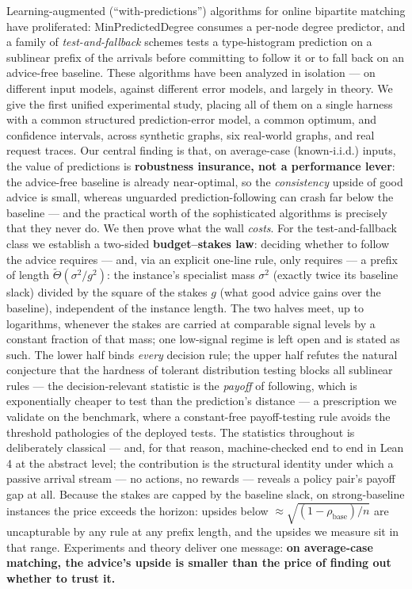 Learning-augmented (``with-predictions'') algorithms for online
bipartite matching have proliferated: MinPredictedDegree consumes a
per-node degree predictor, and a family of \emph{test-and-fallback}
schemes tests a type-histogram prediction on a sublinear prefix of the
arrivals before committing to follow it or to fall back on an
advice-free baseline. These algorithms have been analyzed in isolation
--- on different input models, against different error models, and
largely in theory. We give the first unified experimental study, placing
all of them on a single harness with a common structured
prediction-error model, a common optimum, and confidence intervals,
across synthetic graphs, six real-world graphs, and real request traces.
Our central finding is that, on average-case (known-i.i.d.) inputs, the
value of predictions is \textbf{robustness insurance, not a performance
lever}: the advice-free baseline is already near-optimal, so the
\emph{consistency} upside of good advice is small, whereas unguarded
prediction-following can crash far below the baseline --- and the
practical worth of the sophisticated algorithms is precisely that they
never do. We then prove what the wall \emph{costs}. For the
test-and-fallback class we establish a two-sided \textbf{budget--stakes
law}: deciding whether to follow the advice requires --- and, via an
explicit one-line rule, only requires --- a prefix of length
\(\tilde\Theta(\sigma^2/g^2)\): the instance's specialist mass
\(\sigma^2\) (exactly twice its baseline slack) divided by the square of
the stakes \(g\) (what good advice gains over the baseline), independent
of the instance length. The two halves meet, up to logarithms, whenever
the stakes are carried at comparable signal levels by a constant
fraction of that mass; one low-signal regime is left open and is stated
as such. The lower half binds \emph{every} decision rule; the upper half
refutes the natural conjecture that the hardness of tolerant
distribution testing blocks all sublinear rules --- the
decision-relevant statistic is the \emph{payoff} of following, which is
exponentially cheaper to test than the prediction's distance --- a
prescription we validate on the benchmark, where a constant-free
payoff-testing rule avoids the threshold pathologies of the deployed
tests. The statistics throughout is deliberately classical --- and, for
that reason, machine-checked end to end in Lean 4 at the abstract level;
the contribution is the structural identity under which a passive
arrival stream --- no actions, no rewards --- reveals a policy pair's
payoff gap at all. Because the stakes are capped by the baseline slack,
on strong-baseline instances the price exceeds the horizon: upsides
below \(\approx\sqrt{(1-\rho_{\mathrm{base}})/n}\) are uncapturable by
any rule at any prefix length, and the upsides we measure sit in that
range. Experiments and theory deliver one message: \textbf{on
average-case matching, the advice's upside is smaller than the price of
finding out whether to trust it.}
